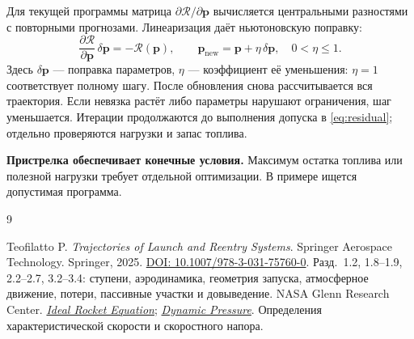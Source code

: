 \documentclass[a4paper,11pt]{article}
\newcommand{\vect}[1]{\boldsymbol{#1}}
\numberwithin{equation}{section}
\begin{document}
Для текущей программы матрица
$\partial\vect{\mathcal R}/\partial\vect p$
вычисляется центральными разностями с повторными прогнозами.
Линеаризация даёт ньютоновскую поправку:
\begin{equation}
\frac{\partial\vect{\mathcal R}}{\partial\vect p}
\,\delta\vect p=-\vect{\mathcal R}(\vect p),\qquad
\vect p_{\mathrm{new}}=\vect p+\eta\,\delta\vect p,
\quad 0<\eta\le1.
\label{eq:newton}
\end{equation}
Здесь $\delta\vect p$ --- поправка параметров, $\eta$ ---
коэффициент её уменьшения: $\eta=1$ соответствует полному шагу.
После обновления снова рассчитывается вся траектория.
Если невязка растёт либо параметры нарушают ограничения,
шаг уменьшается. Итерации продолжаются до выполнения
допуска в \eqref{eq:residual}; отдельно проверяются
нагрузки и запас топлива.

\textbf{Пристрелка обеспечивает конечные условия.}
Максимум остатка топлива или полезной нагрузки требует
отдельной оптимизации. В примере ищется допустимая программа.

\FloatBarrier


\FloatBarrier


\FloatBarrier

\begin{thebibliography}{9}
Teofilatto P. \textit{Trajectories of Launch and Reentry Systems}.
Springer Aerospace Technology. Springer, 2025.
\href{https://doi.org/10.1007/978-3-031-75760-0}
{DOI: 10.1007/978-3-031-75760-0}.
Разд.~1.2, 1.8--1.9, 2.2--2.7, 3.2--3.4:
ступени, аэродинамика, геометрия запуска,
атмосферное движение, потери, пассивные участки и довыведение.
NASA Glenn Research Center.
\href{https://www1.grc.nasa.gov/beginners-guide-to-aeronautics/ideal-rocket-equation/}{\textit{Ideal Rocket Equation}};
\href{https://www1.grc.nasa.gov/beginners-guide-to-aeronautics/dynamic-pressure-2/}{\textit{Dynamic Pressure}}.
Определения характеристической скорости и скоростного напора.
\end{thebibliography}
\end{document}
